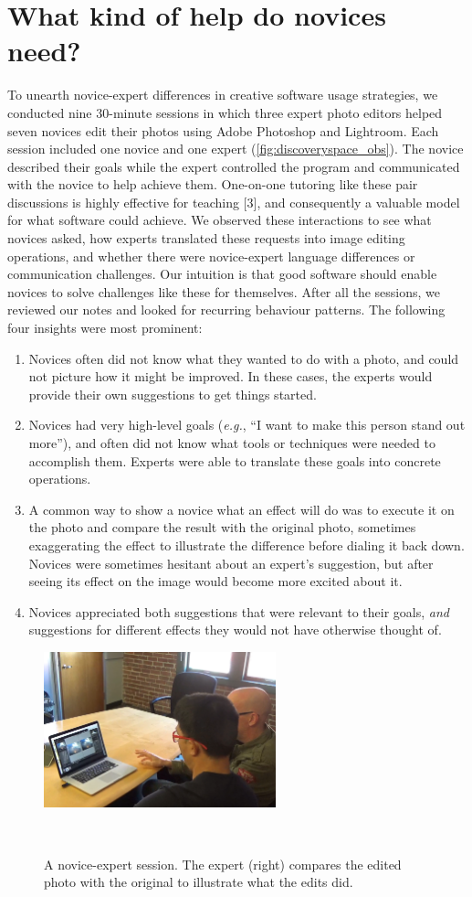 \section{What kind of help do novices need?}
To unearth novice-expert differences in creative software usage strategies, we conducted nine 30-minute sessions in which three expert photo editors helped seven novices edit their photos using Adobe Photoshop and Lightroom. Each session included one novice and one expert (\autoref{fig:discoveryspace_obs}). The novice described their goals while the expert controlled the program and communicated with the novice to help achieve them. One-on-one tutoring like these pair discussions is highly effective for teaching [3], and consequently a valuable model for what software could achieve. We observed these interactions to see what novices asked, how experts translated these requests into image editing operations, and whether there were novice-expert language differences or communication challenges. Our intuition is that good software should enable novices to solve challenges like these for themselves. After all the sessions, we reviewed our notes and looked for recurring behaviour patterns. The following four insights were most prominent:
\begin{enumerate}
    \item Novices often did not know what they wanted to do with a photo, and could not picture how it might be improved. In these cases, the experts would provide their own suggestions to get things started.
    \item Novices had very high-level goals (\textit{e.g.}, ``I want to make this person stand out more''), and often did not know what tools or techniques were needed to accomplish them. Experts were able to translate these goals into concrete operations.
    \item A common way to show a novice what an effect will do was to execute it on the photo and compare the result with the original photo, sometimes exaggerating the effect to illustrate the difference before dialing it back down. Novices were sometimes hesitant about an expert's suggestion, but after seeing its effect on the image would become more excited about it.
    \item Novices appreciated both suggestions that were relevant to their goals, \textit{and} suggestions for different effects they would not have otherwise thought of.
\end{enumerate}

\begin{figure}
\centering
  \includegraphics[width=0.6\textwidth]{discoveryspace/figures/obs.png}
  \caption{A novice-expert session. The expert (right) compares the edited photo with the original to illustrate what the edits did.}~\label{fig:discoveryspace_obs}
\end{figure}
